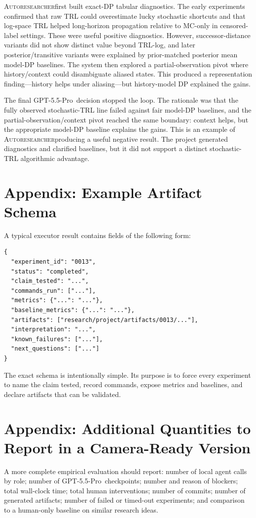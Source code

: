 \documentclass{article}
\newcommand{\sys}{\textsc{Autoresearcher}}
\newcommand{\gptpro}{GPT-5.5-Pro}
\begin{document}
\sys first built exact-DP tabular diagnostics. The early experiments confirmed that raw TRL could overestimate lucky stochastic shortcuts and that log-space TRL helped long-horizon propagation relative to MC-only in censored-label settings. These were useful positive diagnostics. However, successor-distance variants did not show distinct value beyond TRL-log, and later posterior/transitive variants were explained by prior-matched posterior mean model-DP baselines. The system then explored a partial-observation pivot where history/context could disambiguate aliased states. This produced a representation finding---history helps under aliasing---but history-model DP explained the gains.

The final \gptpro\ decision stopped the loop. The rationale was that the fully observed stochastic-TRL line failed against fair model-DP baselines, and the partial-observation/context pivot reached the same boundary: context helps, but the appropriate model-DP baseline explains the gains. This is an example of \sys producing a useful negative result. The project generated diagnostics and clarified baselines, but it did not support a distinct stochastic-TRL algorithmic advantage.

\section{Appendix: Example Artifact Schema}

A typical executor result contains fields of the following form:
\begin{verbatim}
{
  "experiment_id": "0013",
  "status": "completed",
  "claim_tested": "...",
  "commands_run": ["..."],
  "metrics": {"...": "..."},
  "baseline_metrics": {"...": "..."},
  "artifacts": ["research/project/artifacts/0013/..."],
  "interpretation": "...",
  "known_failures": ["..."],
  "next_questions": ["..."]
}
\end{verbatim}
The exact schema is intentionally simple. Its purpose is to force every experiment to name the claim tested, record commands, expose metrics and baselines, and declare artifacts that can be validated.

\section{Appendix: Additional Quantities to Report in a Camera-Ready Version}

A more complete empirical evaluation should report: number of local agent calls by role; number of \gptpro\ checkpoints; number and reason of blockers; total wall-clock time; total human interventions; number of commits; number of generated artifacts; number of failed or timed-out experiments; and comparison to a human-only baseline on similar research ideas.
\end{document}
